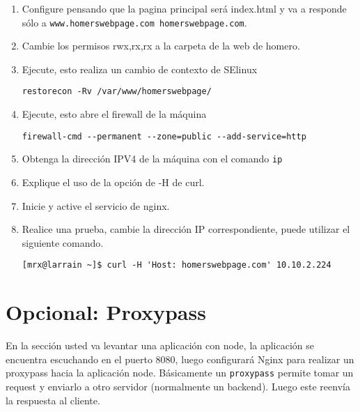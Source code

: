 \documentclass[11pt]{exam}
\begin{document}
\begin{enumerate}
\begin{itemize}
	\end{itemize}
	\item Configure pensando que la pagina principal será index.html y va a responde sólo a \texttt{www.homerswebpage.com homerswebpage.com}.
	\item Cambie los permisos rwx,rx,rx a la carpeta de la web de homero.
	\item Ejecute, esto realiza un cambio de contexto de SElinux
	\begin{lstlisting}
restorecon -Rv /var/www/homerswebpage/
	\end{lstlisting}
	\item Ejecute, esto abre el firewall de la máquina
\begin{lstlisting}
firewall-cmd --permanent --zone=public --add-service=http	
\end{lstlisting}
	\item Obtenga la dirección IPV4 de la máquina con el comando \texttt{ip}
	\item Explique el uso de la opción de -H de curl.
					\vspace{3in}

	\item Inicie y active el servicio de nginx.
	\item Realice una prueba, cambie la dirección IP correspondiente, puede utilizar el siguiente comando.
\begin{lstlisting}
[mrx@larrain ~]$ curl -H 'Host: homerswebpage.com' 10.10.2.224	
\end{lstlisting}

\end{enumerate}
\newpage
\section{Opcional: Proxypass}
En la sección usted va levantar una aplicación con node, la aplicación se encuentra escuchando en el puerto 8080, luego configurará Nginx para realizar un proxypass hacia la aplicación node. Básicamente un \texttt{proxypass} permite tomar un request y enviarlo a otro servidor (normalmente un backend). Luego este reenvía la respuesta al cliente.
\end{document}
